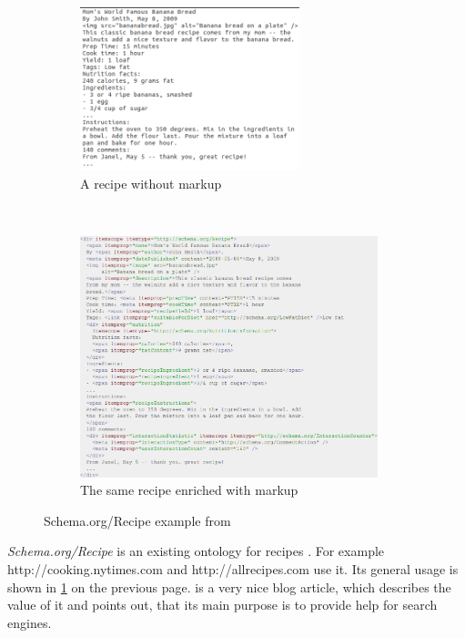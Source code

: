 \documentclass[12pt, twoside]{report}
\begin{document}
\begin{figure}
	\begin{subfigure}{1\textwidth}
		\centering
		\includegraphics[width=0.7\textwidth]{Images/schemaRecipeWithoutMarkup}
		\caption{A recipe without markup}
	\end{subfigure} \\
	\begin{subfigure}{1\textwidth}
		\centering
		\includegraphics[width=0.95\textwidth]{Images/schemaRecipeWithMarkup}
		\caption{The same recipe enriched with markup}
	\end{subfigure}
	\caption{Schema.org/Recipe example from \parencite{schemaRecipe}}
	\label{fig:schemaOrgRecipe}
\end{figure}

\textit{Schema.org/Recipe} is an existing ontology for recipes \parencite{schemaRecipe}. For example http://cooking.nytimes.com and http://allrecipes.com use it. Its general usage is shown in \cref{fig:schemaOrgRecipe} on the previous page. \parencite{foodBlogger} is a very nice blog article, which describes the value of it and points out, that its main purpose is to provide help for search engines.
\end{document}
